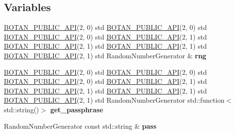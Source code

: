 \subsection*{Variables}
\begin{DoxyCompactItemize}
\item 
\mbox{\label{namespace_botan_1_1_p_k_c_s8_ab5d2d5b166cd076d2dbd598c30943702}} 
\hyperlink{namespace_botan_1_1_p_k_c_s8_a1a8abd3b8ed274b93110ebebefcb0eb6}{B\+O\+T\+A\+N\+\_\+\+P\+U\+B\+L\+I\+C\+\_\+\+A\+PI}(2, 0) std \hyperlink{namespace_botan_1_1_p_k_c_s8_a1a8abd3b8ed274b93110ebebefcb0eb6}{B\+O\+T\+A\+N\+\_\+\+P\+U\+B\+L\+I\+C\+\_\+\+A\+PI}(2, 0) std \hyperlink{namespace_botan_1_1_p_k_c_s8_a1a8abd3b8ed274b93110ebebefcb0eb6}{B\+O\+T\+A\+N\+\_\+\+P\+U\+B\+L\+I\+C\+\_\+\+A\+PI}(2, 0) std \hyperlink{namespace_botan_1_1_p_k_c_s8_a1a8abd3b8ed274b93110ebebefcb0eb6}{B\+O\+T\+A\+N\+\_\+\+P\+U\+B\+L\+I\+C\+\_\+\+A\+PI}(2, 1) std \hyperlink{namespace_botan_1_1_p_k_c_s8_a1a8abd3b8ed274b93110ebebefcb0eb6}{B\+O\+T\+A\+N\+\_\+\+P\+U\+B\+L\+I\+C\+\_\+\+A\+PI}(2, 1) std \hyperlink{namespace_botan_1_1_p_k_c_s8_a1a8abd3b8ed274b93110ebebefcb0eb6}{B\+O\+T\+A\+N\+\_\+\+P\+U\+B\+L\+I\+C\+\_\+\+A\+PI}(2, 1) std \hyperlink{namespace_botan_1_1_p_k_c_s8_a1a8abd3b8ed274b93110ebebefcb0eb6}{B\+O\+T\+A\+N\+\_\+\+P\+U\+B\+L\+I\+C\+\_\+\+A\+PI}(2, 1) std Random\+Number\+Generator \& {\bfseries rng}
\item 
\mbox{\label{namespace_botan_1_1_p_k_c_s8_a8f34bd15202e08b3f0f4536a9b66c592}} 
\hyperlink{namespace_botan_1_1_p_k_c_s8_a1a8abd3b8ed274b93110ebebefcb0eb6}{B\+O\+T\+A\+N\+\_\+\+P\+U\+B\+L\+I\+C\+\_\+\+A\+PI}(2, 0) std \hyperlink{namespace_botan_1_1_p_k_c_s8_a1a8abd3b8ed274b93110ebebefcb0eb6}{B\+O\+T\+A\+N\+\_\+\+P\+U\+B\+L\+I\+C\+\_\+\+A\+PI}(2, 0) std \hyperlink{namespace_botan_1_1_p_k_c_s8_a1a8abd3b8ed274b93110ebebefcb0eb6}{B\+O\+T\+A\+N\+\_\+\+P\+U\+B\+L\+I\+C\+\_\+\+A\+PI}(2, 0) std \hyperlink{namespace_botan_1_1_p_k_c_s8_a1a8abd3b8ed274b93110ebebefcb0eb6}{B\+O\+T\+A\+N\+\_\+\+P\+U\+B\+L\+I\+C\+\_\+\+A\+PI}(2, 1) std \hyperlink{namespace_botan_1_1_p_k_c_s8_a1a8abd3b8ed274b93110ebebefcb0eb6}{B\+O\+T\+A\+N\+\_\+\+P\+U\+B\+L\+I\+C\+\_\+\+A\+PI}(2, 1) std \hyperlink{namespace_botan_1_1_p_k_c_s8_a1a8abd3b8ed274b93110ebebefcb0eb6}{B\+O\+T\+A\+N\+\_\+\+P\+U\+B\+L\+I\+C\+\_\+\+A\+PI}(2, 1) std \hyperlink{namespace_botan_1_1_p_k_c_s8_a1a8abd3b8ed274b93110ebebefcb0eb6}{B\+O\+T\+A\+N\+\_\+\+P\+U\+B\+L\+I\+C\+\_\+\+A\+PI}(2, 1) std Random\+Number\+Generator std\+::function$<$ std\+::string()$>$ {\bfseries get\+\_\+passphrase}
\item 
\mbox{\label{namespace_botan_1_1_p_k_c_s8_a09579aec1504665fce7ad86098758f72}} 
Random\+Number\+Generator const std\+::string \& {\bfseries pass}
\end{DoxyCompactItemize}


